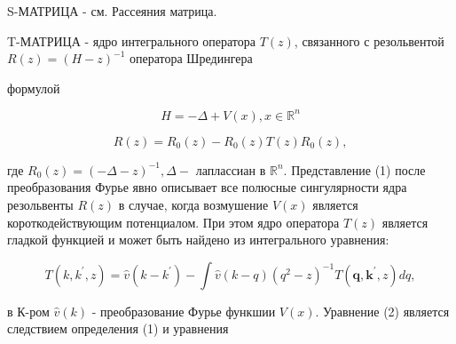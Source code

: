 \documentclass[10pt]{article}
\begin{document}
S-МАТРИЦА - см. Рассеяния матрица.



T-МАТРИЦА - ядро интегрального оператора $T(z)$, связанного с резольвентой $R(z)=(H-z)^{-1}$ оператора Шредингера



формулой



\[

H=-\Delta+V(x), x \in \mathbb{R}^{n}

\]



\[

R(z)=R_{0}(z)-R_{0}(z) T(z) R_{0}(z),

\]



где $R_{0}(z)=(-\Delta-z)^{-1}, \Delta-$ лаплассиан в $\mathbb{R}^{n}$. Представление (1) после преобразования Фурье явно описывает все полюсные сингулярности ядра резольвенты $R(z)$ в случае, когда возмушение $V(x)$ является короткодействующим потенциалом. При этом ядро оператора $T(z)$ является гладкой функцией и может быть найдено из интегрального уравнения:



\[

T\left(k, k^{\prime}, z\right)=\hat{v}\left(k-k^{\prime}\right)-\int \hat{v}(k-q)\left(q^{2}-z\right)^{-1} T\left(\boldsymbol{q}, \boldsymbol{k}^{\prime}, z\right) d q,

\]



в К-ром $\hat{v}(k)$ - преобразование Фурье функшии $V(x)$. Уравнение (2) является следствием определения (1) и уравнения
\end{document}
